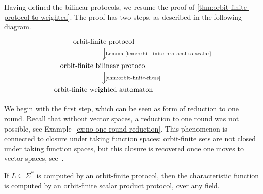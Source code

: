 Having defined the bilinear protocols, we resume the proof of \cref{thm:orbit-finite-protocol-to-weighted}. The proof has two steps, as described in the following diagram.
\[
\begin{tikzcd}
\text{orbit-finite protocol}
\ar[d,Rightarrow,"\text{Lemma~\ref{lem:orbit-finite-protocol-to-scalar}}"]
\\
\text{orbit-finite bilinear protocol}
\ar[d,Rightarrow, "\text{\cref{thm:orbit-finite-fliess}}"]
\\
\text{orbit-finite weighted automaton}
\end{tikzcd}
\]

We begin with the first step, which can be seen as form of reduction to one round. Recall that without vector spaces, a reduction to one round was not possible, see Example~\ref{ex:no-one-round-reduction}. This phenomenon is connected to closure under taking function spaces: orbit-finite sets are not closed under taking function spaces, but this closure is recovered once one moves to vector spaces, see~\cite[Section 8.3]{bojanczyk_slightly}. 

\begin{lemma}\label{lem:orbit-finite-protocol-to-scalar}
    If $L \subseteq \Sigma^*$ is computed by an orbit-finite protocol, then the characteristic function is computed by an orbit-finite scalar product protocol, over any field.
\end{lemma}


